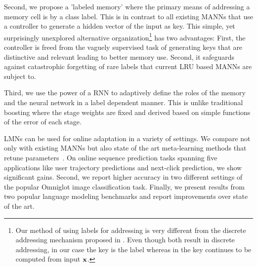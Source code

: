 \documentclass[letterpaper]{article} %
\newcommand{\vek}[1]{{\bf {#1}}}
\newcommand{\vx}{{\vek{x}}}
\def\sunita#1{\todo [color=purple]{Sunita: #1}}
\begin{document}
Second, we propose a 'labeled memory' where the primary means of addressing a memory cell is by a class label.  This is in contrast to all existing MANNs that use a controller to generate a hidden vector of the input as key.  This simple, yet surprisingly unexplored alternative organization\footnote{Our method of using labels for addressing is very different from the discrete addressing mechanism proposed in \cite{GulcehreCCB16}.  Even though both result in discrete addressing, in our case the key is the label whereas in \cite{GulcehreCCB16} the key continues to be computed from input $\vx$.} has two advantages: First, the controller is freed from the vaguely supervised task of generating keys that are distinctive and relevant leading to better memory use.  Second, it safeguards against catastrophic forgetting of rare labels that current LRU based MANNs are subject to.

Third, we use the power of a RNN to adaptively define the roles of the memory and the neural network in a label dependent manner.  This is unlike traditional boosting where the stage weights are fixed and derived based on simple functions of the error of each stage.

LMNs can be used for online adaptation in a variety of settings.  We compare not only with existing MANNs but also state of the art meta-learning methods that retune parameters~\cite{Rei15,Finn2017ModelAgnosticMF}.
On online sequence prediction tasks spanning five applications like user trajectory predictions and next-click prediction,  we show significant gains.
Second, we report higher accuracy in two different settings of the popular Omniglot image classification task. Finally, we present results from two popular language modeling benchmarks and report improvements over state of the art.



\end{document}
